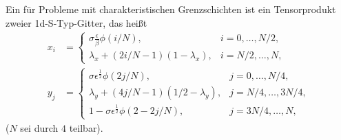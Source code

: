 \begin{definition}\label{def:7-11}
  Ein  für Probleme mit charakteristischen Grenzschichten ist ein Tensorprodukt zweier 1d-S-Typ-Gitter, das heißt
  \begin{align*}
    x_{i} &=
    \begin{cases}
      \sigma \frac \epsilon\beta \phi (i/N), & i = 0, \dots, N/2, \\
\lambda_{x} + (2 i/N - 1)(1 - \lambda_{x}), & i = N/2, \dots, N,
    \end{cases}
\\
    y_{j} &=
    \begin{cases}
      \sigma \epsilon^{\frac 12} \phi (2j/N), & j = 0, \dots, N/4, \\
      \lambda_{y} + (4 j/N - 1)(1/2 - \lambda_{y}), & j = N/4, \dots, 3N/4,\\
      1 - \sigma\epsilon^{\frac 12} \phi (2-2j/N), & j = 3N/4, \dots, N,
    \end{cases}
  \end{align*}
($N$ sei durch $4$ teilbar).

\begin{figure}[ht!]
  \centering
\end{figure}
\end{definition}

